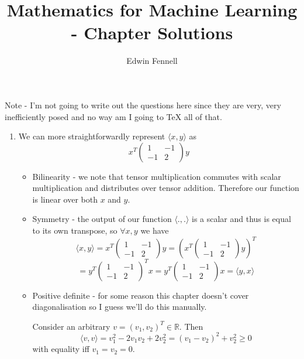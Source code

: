 \documentclass{article}
\title{Mathematics for Machine Learning - Chapter \chapternumber\space Solutions}
\author{Edwin Fennell}
\date{}
\newcommand{\chapternumber}{3}
\newenvironment{QandA}{\begin{enumerate}[label=\chapternumber.\arabic*]\bfseries\boldmath}
	{\end{enumerate}}
\newenvironment{answered}{\par\bigskip\normalfont\unboldmath}{}
\begin{document}
	\maketitle
	
	Note - I'm not going to write out the questions here since they are very, very inefficiently posed and no way am I going to TeX all of that.
	
		
	\noindent%
	\begin{QandA}
		\item 
		\begin{answered}
			We can more straightforwardly represent $\langle x,y\rangle$ as 
			\[x^T
			\begin{pmatrix}
				1 & -1 \\
				-1 & 2
			\end{pmatrix}
			y\]
			\begin{itemize}
				\item Bilinearity - we note that tensor multiplication commutes with scalar multiplication and distributes over tensor addition. Therefore our function is linear over both $x$ and $y$.
				\item Symmetry - the output of our function $\langle .,.\rangle$ is a scalar and thus is equal to its own transpose, so $\forall x,y$ we have
				\[
				\langle x,y\rangle
				=
				x^T
				\begin{pmatrix}
					1 & -1 \\
					-1 & 2
				\end{pmatrix}
				y
				=
				\left(
				x^T
				\begin{pmatrix}
					1 & -1 \\
					-1 & 2
				\end{pmatrix}
				y
				\right)^T
				\]
				\[
				=
				y^T
				\begin{pmatrix}
					1 & -1 \\
					-1 & 2
				\end{pmatrix}^T
				x
				=
								y^T
				\begin{pmatrix}
					1 & -1 \\
					-1 & 2
				\end{pmatrix}
				x
				=
				\langle y,x\rangle
				\]
				\item Positive definite - for some reason this chapter doesn't cover diagonalisation so I guess we'll do this manually. 
				
				Consider an arbitrary $v = (v_1,v_2)^T\in\mathbb{R}$. Then
				\[\langle v,v \rangle = 
				v_1^2-2v_1v_2+2v_2^2 = (v_1-v_2)^2 + v_2^2\geq0								
				\]
				with equality iff $v_1=v_2=0$.
			\end{itemize}
		\end{answered}
	\end{QandA}
\end{document}
